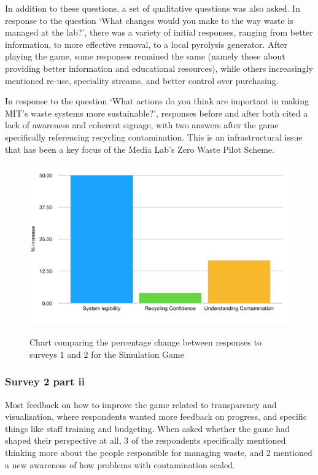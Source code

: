 \documentclass[nofonts,nols,justified,nobib]{tufte-book}
\begin{document}
In addition to these questions, a set of qualitative questions was also asked. In response to the question `What changes would you make to the way waste is managed at the lab?', there was a variety of initial responses, ranging from better information, to more effective removal, to a local pyrolysis generator. After playing the game, some responses remained the same (namely those about providing better information and educational resources), while others increasingly mentioned re-use, speciality streams, and better control over purchasing.

In response to the question `What actions do you think are important in making MIT's waste systems more sustainable?', responses before and after both cited a lack of awareness and coherent signage, with two answers after the game specifically referencing recycling contamination. This is an infrastructural issue that has been a key focus of the Media Lab's Zero Waste Pilot Scheme.


\begin{figure}
  \caption{Chart comparing the percentage change between responses to surveys 1 and 2 for the Simulation Game}
  \includegraphics[width=1\linewidth]{img/4/attitude-changes-sim.png}
  \label{contamination}
\end{figure}


\subsubsection*{Survey 2 part ii}
Most feedback on how to improve the game related to transparency and visualisation, where respondents wanted more feedback on progress, and specific things like staff training and budgeting. When asked whether the game had shaped their perspective at all, 3 of the respondents specifically mentioned thinking more about the people responsible for managing waste, and 2 mentioned a new awareness of how problems with contamination scaled.
\end{document}
